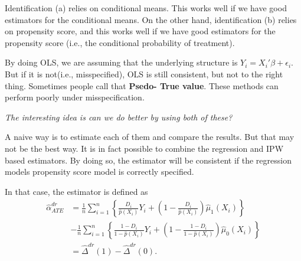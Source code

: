 \documentclass[11pt,a4paper]{amsart}
\theoremstyle{plain}
\theoremstyle{definition}
\begin{document}
	Identification (a) relies on conditional means. This works well if we have good estimators for the conditional means. On the other hand, identification (b) relies on propensity score, and this works well if we have good estimators for the propensity score (i.e., the conditional probability of treatment). \par 
	By doing OLS, we are assuming that the underlying structure is $Y_{i} = X_{i}' \beta + \epsilon_{i}$. But if it is not(i.e., misspecified), OLS is still consistent, but not to the right thing. Sometimes people call that \textbf{Psedo- True value}. These methods can perform poorly under misspeciﬁcation.\par 
	\emph{The interesting idea is can we do better by using both of these?} \par 
	A naive way is to estimate each of them and compare the results. But that may not be the best way. It is in fact possible to combine the regression and IPW based estimators. By doing so, the estimator will be consistent if  the regression models  propensity score model is correctly specified. \par 
	In that case, the estimator is defined as 
	\[\begin{aligned}
		\hat{\alpha}_{ATE}^{dr} &= \frac{1}{n}\sum_{i=1}^{n}\left\{\frac{D_{i}}{\hat{p}(X_{i})} Y_{i} + \left(1- \frac{D_{i}}{\hat{p}(X_{i})}\right) \hat{\mu}_{1}(X_{i}) \right\} \\
		&- \frac{1}{n}\sum_{i=1}^{n}\left\{\frac{1-D_{i}}{1-\hat{p}(X_{i})} Y_{i} + \left(1- \frac{1-D_{i}}{1-\hat{p}(X_{i})}\right) \hat{\mu}_{0}(X_{i}) \right\} \\
		&= \hat{\Delta}^{dr}(1) - \hat{\Delta}^{dr}(0). 
	\end{aligned}	\]
	
\end{document}
